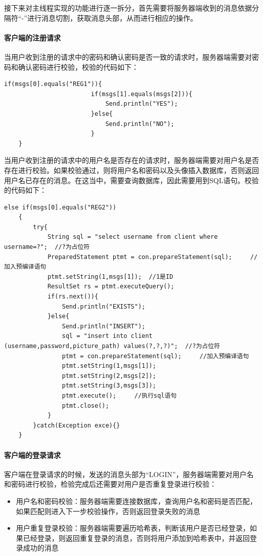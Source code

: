 \documentclass[UTF8,12pt]{article}
\begin{document}
接下来对主线程实现的功能进行逐一拆分，首先需要将服务器端收到的消息依据分隔符“-”进行消息切割，获取消息头部，从而进行相应的操作。

\paragraph{客户端的注册请求}

当用户收到注册的请求中的密码和确认密码是否一致的请求时，服务器端需要对密码和确认密码进行校验，校验的代码如下：
\begin{lstlisting}[title=确认密码校验,frame=shadowbox]
    if(msgs[0].equals("REG1")){
                        if(msgs[1].equals(msgs[2])){
                            Send.println("YES");
                        }else{
                            Send.println("NO");
                        }
    }
\end{lstlisting}

当用户收到注册的请求中的用户名是否存在的请求时，服务器端需要对用户名是否存在进行校验。如果校验通过，则将用户名和密码以及头像插入数据库，否则返回用户名已存在的消息。在这当中，需要查询数据库，因此需要用到SQL语句。校验的代码如下：

\begin{lstlisting}[title=用户名是否存在校验,frame=shadowbox]
    else if(msgs[0].equals("REG2"))
    {
        try{
            String sql = "select username from client where username=?";  //?为占位符
            PreparedStatement ptmt = con.prepareStatement(sql);     //加入预编译语句
            ptmt.setString(1,msgs[1]);  //1是ID
            ResultSet rs = ptmt.executeQuery();
            if(rs.next()){
                Send.println("EXISTS");
            }else{
                Send.println("INSERT");
                sql = "insert into client (username,password,picture_path) values(?,?,?)";  //?为占位符
                ptmt = con.prepareStatement(sql);     //加入预编译语句
                ptmt.setString(1,msgs[1]);
                ptmt.setString(2,msgs[2]);
                ptmt.setString(3,msgs[3]);
                ptmt.execute();     //执行sql语句
                ptmt.close();
            }
        }catch(Exception exce){}
    }
\end{lstlisting}

\paragraph{客户端的登录请求}
客户端在登录请求的时候，发送的消息头部为“LOGIN”，服务器端需要对用户名和密码进行校验，检验完成后还需要对用户是否重复登录进行校验：
\begin{itemize}
    \item 用户名和密码校验：服务器端需要连接数据库，查询用户名和密码是否匹配，如果匹配则进入下一步校验操作，否则返回登录失败的消息
    \item 用户重复登录校验：服务器端需要遍历哈希表，判断该用户是否已经登录，如果已经登录，则返回重复登录的消息，否则将用户添加到哈希表中，并返回登录成功的消息
\end{itemize}
\end{document}
